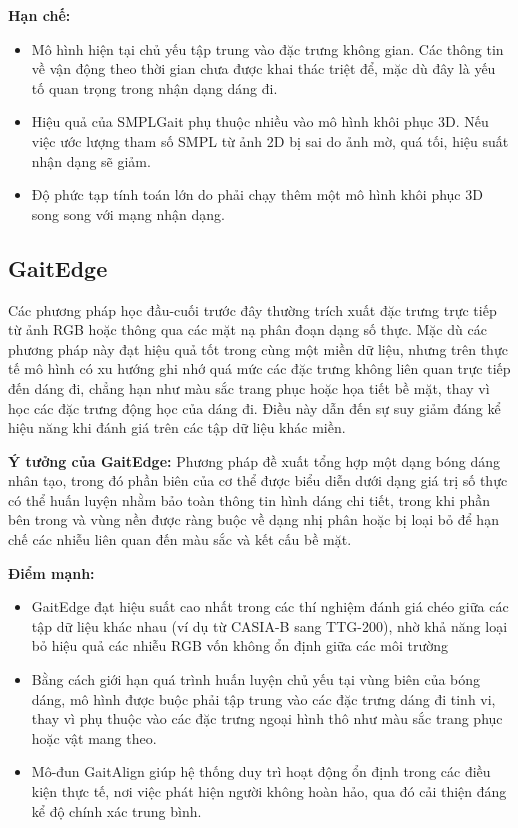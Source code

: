\textbf{Hạn chế:}
\begin{itemize}
  \item Mô hình hiện tại chủ yếu tập trung vào đặc trưng không gian. Các thông tin về vận động theo thời gian chưa được khai thác triệt để, mặc dù đây là yếu tố quan trọng trong nhận dạng dáng đi.
  \item Hiệu quả của SMPLGait phụ thuộc nhiều vào mô hình khôi phục 3D. Nếu việc ước lượng tham số SMPL từ ảnh 2D bị sai do ảnh mờ, quá tối, hiệu suất nhận dạng sẽ giảm.
  \item Độ phức tạp tính toán lớn do phải chạy thêm một mô hình khôi phục 3D song song với mạng nhận dạng.
\end{itemize}

\subsection{GaitEdge \cite{liang2022gaitedgeplainendtoendgait}}
Các phương pháp học đầu-cuối trước đây thường trích xuất đặc trưng trực tiếp từ ảnh RGB hoặc thông qua các mặt nạ phân đoạn dạng số thực. Mặc dù các phương pháp này đạt hiệu quả tốt trong cùng một miền dữ liệu, nhưng trên thực tế mô hình có xu hướng ghi nhớ quá mức các đặc trưng không liên quan trực tiếp đến dáng đi, chẳng hạn như màu sắc trang phục hoặc họa tiết bề mặt, thay vì học các đặc trưng động học của dáng đi. Điều này dẫn đến sự suy giảm đáng kể hiệu năng khi đánh giá trên các tập dữ liệu khác miền.


\textbf{Ý tưởng của GaitEdge:}
Phương pháp đề xuất tổng hợp một dạng bóng dáng nhân tạo, trong đó phần biên của cơ thể được biểu diễn dưới dạng giá trị số thực có thể huấn luyện nhằm bảo toàn thông tin hình dáng chi tiết, trong khi phần bên trong và vùng nền được ràng buộc về dạng nhị phân hoặc bị loại bỏ để hạn chế các nhiễu liên quan đến màu sắc và kết cấu bề mặt.


\textbf{Điểm mạnh:}
\begin{itemize}
  \item GaitEdge đạt hiệu suất cao nhất trong các thí nghiệm đánh giá chéo giữa các tập dữ liệu khác nhau (ví dụ từ CASIA-B sang TTG-200), nhờ khả năng loại bỏ hiệu quả các nhiễu RGB vốn không ổn định giữa các môi trường
  \item Bằng cách giới hạn quá trình huấn luyện chủ yếu tại vùng biên của bóng dáng, mô hình được buộc phải tập trung vào các đặc trưng dáng đi tinh vi, thay vì phụ thuộc vào các đặc trưng ngoại hình thô như màu sắc trang phục hoặc vật mang theo.
  \item Mô-đun GaitAlign giúp hệ thống duy trì hoạt động ổn định trong các điều kiện thực tế, nơi việc phát hiện người không hoàn hảo, qua đó cải thiện đáng kể độ chính xác trung bình.
\end{itemize}

